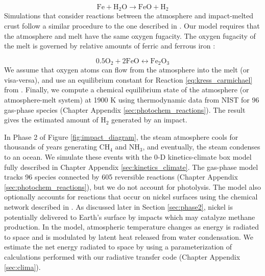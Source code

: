 \begin{equation}
  \mathrm{Fe} + \mathrm{H_2O} \rightarrow \mathrm{FeO} + \mathrm{H_2}
\end{equation}
Simulations that consider reactions between the atmosphere and impact-melted crust follow a similar procedure to the one described in \citet{Itcovitz_2022}. Our model requires that the atmosphere and melt have the same oxygen fugacity. The oxygen fugacity of the melt is governed by relative amounts of ferric and ferrous iron \citep{Kress_1991}:

\begin{equation} 
  \label{eq:kress_carmichael}
  0.5 \mathrm{O_2} + 2 \mathrm{FeO} \leftrightarrow \mathrm{Fe_2O_3}
\end{equation}
We assume that oxygen atoms can flow from the atmosphere into the melt (or visa-versa), and use an equilibrium constant for Reaction \ref{eq:kress_carmichael} from \citet{Kress_1991}. Finally, we compute a chemical equilibrium state of the atmosphere (or atmosphere-melt system) at 1900 K using thermodynamic data from NIST for 96 gas-phase species (Chapter Appendix \ref{sec:photochem_reactions}). The result gives the estimated amount of H$_2$ generated by an impact.

In Phase 2 of Figure \ref{fig:impact_diagram}, the steam atmosphere cools for thousands of years generating CH$_4$ and NH$_3$, and eventually, the steam condenses to an ocean. We simulate these events with the 0-D kinetics-climate box model fully described in Chapter Appendix \ref{sec:kinetics_climate}. The gas-phase model tracks 96 species connected by 605 reversible reactions (Chapter Appendix \ref{sec:photochem_reactions}), but we do not account for photolysis. The model also optionally accounts for reactions that occur on nickel surfaces using the chemical network described in \citet{Schmider_2021}. As discussed later in Section \ref{sec:phase2}, nickel is potentially delivered to Earth's surface by impacts which may catalyze methane production. In the model, atmospheric temperature changes as energy is radiated to space and is modulated by latent heat released from water condensation. We estimate the net energy radiated to space by using a parameterization of calculations performed with our radiative transfer code (Chapter Appendix \ref{sec:clima}).

